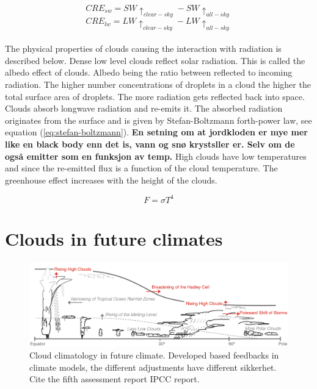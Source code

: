 \begin{equation} \label{eq:cre_sw}
    CRE_{sw} = SW\uparrow_{clear-sky} - SW\uparrow_{all-sky}
\end{equation}
\begin{equation} \label{eq:cre_lw}
    CRE_{lw} = LW\uparrow_{clear-sky} - LW\uparrow_{all-sky}
\end{equation}
\\
The physical properties of clouds causing the interaction with radiation is described below. Dense low level clouds reflect solar radiation. This is called the albedo effect of clouds. Albedo being the ratio between reflected to incoming radiation. The higher number concentrations of droplets in a cloud the higher the total surface area of droplets. The more radiation gets reflected back into space. Clouds absorb longwave radiation and re-emits it. The absorbed radiation originates from the surface and is given by Stefan-Boltzmann forth-power law, see equation (\ref{eq:stefan-boltzmann}). \textbf{En setning om at jordkloden er mye mer like en black body enn det is, vann og snø krystsller er. Selv om de også emitter som en funksjon av temp. } High clouds have low temperatures and since the re-emitted flux is a function of the cloud temperature. The greenhouse effect increases with the height of the clouds.

\begin{equation} \label{eq:stefan-boltzmann}
    F = \sigma T ^4
\end{equation}

\section{Clouds in future climates} \label{sec:intro_cloud_future_climates}
\begin{figure}[h]
    \centering
    \includegraphics[scale = 0.8]{Chapter1_Intro/images/Fig7-11_ipcc.jpg}
    \caption{Cloud climatology in future climate. Developed based feedbacks in climate models, the different adjustments have different sikkerhet. Cite the fifth assessment report IPCC report.}
    \label{fig:cloud_scheme}
\end{figure}


